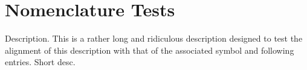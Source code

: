 
\chapter{Nomenclature Tests}

\MakeNomenclatureNotStarred
{}
\begin{Nomenclature}[section]
      {Description. This is a rather long and ridiculous description designed to test the alignment of 
                 this description with that of the associated symbol and following entries.}
        {Short desc.}
\end{Nomenclature}

